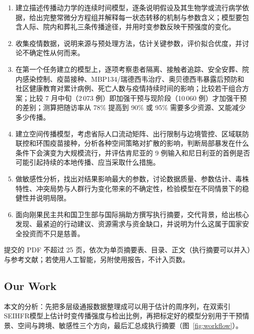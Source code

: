 \begin{enumerate}[label=\arabic*.,leftmargin=1.8em]
  \item 建立描述传播动力学的连续时间模型，逐条说明假设及其生物学或流行病学依据，给出完整常微分方程组并解释每一状态转移的机制与参数含义；模型要包含人际、院内和葬礼三条传播途径，并用时变参数反映干预强度的变化。
  \item 收集疫情数据，说明来源与预处理方法，估计关键参数，评价拟合优度，并讨论不确定性从何而来。
  \item 在第一个任务建立的模型上，逐项考察患者隔离、接触者追踪、安全安葬、院内感染控制、疫苗接种、MBP134/瑞德西韦治疗、奥贝德西韦暴露后预防和社区健康教育对累计病例、死亡人数与疫情持续时间的影响；比较若干组合方案；比较 7 月中旬（2\,073 例）即加强干预与现阶段（10\,060 例）才加强干预的差别；测算把随访率从 78\% 提高到 90\% 或 95\% 需要多少资源、又能减少多少传播。
  \item 建立空间传播模型，考虑省际人口流动矩阵、出行限制与边境管控、区域联防联控和环围疫苗接种，分析各种空间策略对扩散的影响，判断局部暴发在什么条件下会演变为大规模流行，并评估肯尼亚的 9 例输入和尼日利亚的首例是否可能引起持续的本地传播、应当采取什么措施。
  \item 做敏感性分析，找出对结果影响最大的参数，讨论数据质量、参数估计、毒株特性、冲突局势与人群行为变化带来的不确定性，检验模型在不同情景下的稳健性并说明局限。
  \item 面向刚果民主共和国卫生部与国际捐助方撰写执行摘要，交代背景，给出核心发现、最紧迫的行动建议、资源需求与资金缺口，并说明为什么这属于国家安全投资而不只是慈善。
\end{enumerate}

提交的 PDF 不超过 25 页，依次为单页摘要表、目录、正文（执行摘要可以并入）与参考文献；若使用人工智能，另附使用报告，不计入页数。

\subsection{Our Work}

本文的分析：先把多层级通报数据整理成可以用于估计的周序列，在双索引SEIHFR模型上估计时变传播强度与检出比例，再把标定好的模型分别用于干预情景、空间与跨境、敏感性三个方向，最后汇总成执行摘要（图~\ref{fig:workflow}）。

